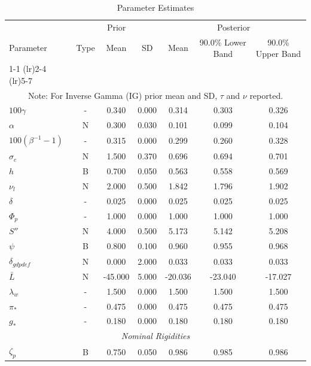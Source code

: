 \documentclass[12pt]{article}
\begin{document}
\pagestyle{empty}
\vspace*{.5cm}
{\small
\begin{longtable}{lcccccc}
\caption{Parameter Estimates}
\\ \hline
\multicolumn{1}{c}{} & \multicolumn{3}{c}{Prior} & \multicolumn{3}{c}{Posterior} \\
Parameter & Type & Mean & SD & Mean & 90.0\% {\tiny Lower Band} & 90.0\% {\tiny Upper Band} \\
\cmidrule(lr){1-1} \cmidrule(lr){2-4} \cmidrule(lr){5-7}
\endhead
\hline
\\ \multicolumn{7}{c}{\footnotesize Note: For Inverse Gamma (IG) prior mean and SD, $\tau$ and $\nu$ reported.}
\endfoot
\multicolumn{7}{c}{\textit{Steady State}} \\[3pt]
$100\gamma$ & - &    0.340 &    0.000 &    0.314 &    0.303 &    0.326 \\
$\alpha$ & N &    0.300 &    0.030 &    0.101 &    0.099 &    0.104 \\
$100(\beta^{-1} - 1)$ & - &    0.315 &    0.000 &    0.299 &    0.260 &    0.328 \\
$\sigma_{c}$ & N &    1.500 &    0.370 &    0.696 &    0.694 &    0.701 \\
$   h$ & B &    0.700 &    0.050 &    0.563 &    0.558 &    0.569 \\
$\nu_l$ & N &    2.000 &    0.500 &    1.842 &    1.796 &    1.902 \\
$\delta$ & - &    0.025 &    0.000 &    0.025 &    0.025 &    0.025 \\
$\Phi_p$ & - &    1.000 &    0.000 &    1.000 &    1.000 &    1.000 \\
$ S''$ & N &    4.000 &    0.500 &    5.173 &    5.142 &    5.208 \\
$\psi$ & B &    0.800 &    0.100 &    0.960 &    0.955 &    0.968 \\
$\delta_{gdpdef}$ & N &    0.000 &    2.000 &    0.033 &    0.033 &    0.033 \\
$\bar{L}$ & N &  -45.000 &    5.000 &  -20.036 &  -23.040 &  -17.027 \\
$\lambda_w$ & - &    1.500 &    0.000 &    1.500 &    1.500 &    1.500 \\
$\pi_*$ & - &    0.475 &    0.000 &    0.475 &    0.475 &    0.475 \\
$ g_*$ & - &    0.180 &    0.000 &    0.180 &    0.180 &    0.180 \\
\multicolumn{7}{c}{\textit{Nominal Rigidities}} \\[3pt]
$\zeta_p$ & B &    0.750 &    0.050 &    0.986 &    0.985 &    0.986 \\

\end{longtable}}
\end{document}
